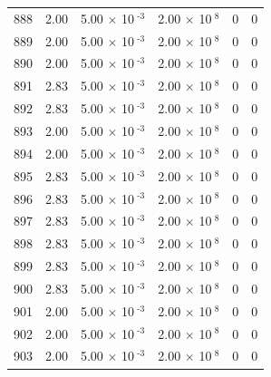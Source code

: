 \documentclass[a4paper,11pt]{article}
\begin{document}
\begin{center}
\begin{longtable}{|R{1.5cm}|R{2.4cm}|R{2.4cm}|R{2.4cm}|R{2.4cm}|R{2.4cm}|}
  888 &   2.00  &         5.00 $\times$ 10$^{\text{          -3}}$  &         2.00 $\times$ 10$^{\text{           8}}$  & 0  & 0 \\
  889 &   2.00  &         5.00 $\times$ 10$^{\text{          -3}}$  &         2.00 $\times$ 10$^{\text{           8}}$  & 0  & 0 \\
  890 &   2.00  &         5.00 $\times$ 10$^{\text{          -3}}$  &         2.00 $\times$ 10$^{\text{           8}}$  & 0  & 0 \\
  891 &   2.83  &         5.00 $\times$ 10$^{\text{          -3}}$  &         2.00 $\times$ 10$^{\text{           8}}$  & 0  & 0 \\
  892 &   2.83  &         5.00 $\times$ 10$^{\text{          -3}}$  &         2.00 $\times$ 10$^{\text{           8}}$  & 0  & 0 \\
  893 &   2.00  &         5.00 $\times$ 10$^{\text{          -3}}$  &         2.00 $\times$ 10$^{\text{           8}}$  & 0  & 0 \\
  894 &   2.00  &         5.00 $\times$ 10$^{\text{          -3}}$  &         2.00 $\times$ 10$^{\text{           8}}$  & 0  & 0 \\
  895 &   2.83  &         5.00 $\times$ 10$^{\text{          -3}}$  &         2.00 $\times$ 10$^{\text{           8}}$  & 0  & 0 \\
  896 &   2.83  &         5.00 $\times$ 10$^{\text{          -3}}$  &         2.00 $\times$ 10$^{\text{           8}}$  & 0  & 0 \\
  897 &   2.83  &         5.00 $\times$ 10$^{\text{          -3}}$  &         2.00 $\times$ 10$^{\text{           8}}$  & 0  & 0 \\
  898 &   2.83  &         5.00 $\times$ 10$^{\text{          -3}}$  &         2.00 $\times$ 10$^{\text{           8}}$  & 0  & 0 \\
  899 &   2.83  &         5.00 $\times$ 10$^{\text{          -3}}$  &         2.00 $\times$ 10$^{\text{           8}}$  & 0  & 0 \\
  900 &   2.83  &         5.00 $\times$ 10$^{\text{          -3}}$  &         2.00 $\times$ 10$^{\text{           8}}$  & 0  & 0 \\
  901 &   2.00  &         5.00 $\times$ 10$^{\text{          -3}}$  &         2.00 $\times$ 10$^{\text{           8}}$  & 0  & 0 \\
  902 &   2.00  &         5.00 $\times$ 10$^{\text{          -3}}$  &         2.00 $\times$ 10$^{\text{           8}}$  & 0  & 0 \\
  903 &   2.00  &         5.00 $\times$ 10$^{\text{          -3}}$  &         2.00 $\times$ 10$^{\text{           8}}$  & 0  & 0 \\

\end{longtable}
\end{center}
\end{document}

